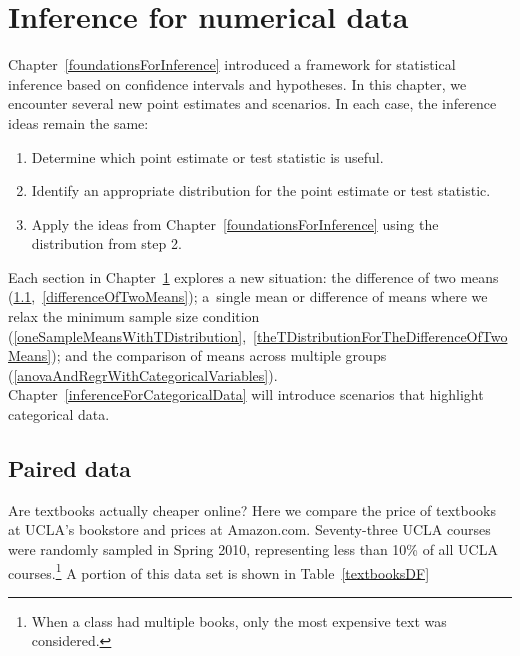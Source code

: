 \chapter{Inference for numerical data}
\label{inferenceForNumericalData}

Chapter~\ref{foundationsForInference} introduced a framework for statistical inference based on confidence intervals and hypotheses. In this chapter, we encounter several new point estimates and scenarios. In each case, the inference ideas remain the same:
\begin{enumerate}
\setlength{\itemsep}{0mm}
\item Determine which point estimate or test statistic is useful.
\item Identify an appropriate distribution for the point estimate or test statistic.
\item Apply the ideas from Chapter~\ref{foundationsForInference} using the distribution from step 2.
\end{enumerate}
Each section in Chapter~\ref{inferenceForNumericalData} explores a new situation: the difference of two means (\ref{pairedData},~\ref{differenceOfTwoMeans}); a~single mean or difference of means where we relax the minimum sample size condition (\ref{oneSampleMeansWithTDistribution},~\ref{theTDistributionForTheDifferenceOfTwoMeans}); and the comparison of means across multiple groups (\ref{anovaAndRegrWithCategoricalVariables}). Chapter~\ref{inferenceForCategoricalData} will introduce scenarios that highlight categorical data.


\section{Paired data}
\label{pairedData}


Are textbooks actually cheaper online? Here we compare the price of textbooks at UCLA's bookstore and prices at Amazon.com. Seventy-three UCLA courses were randomly sampled in Spring 2010, representing less than 10\% of all UCLA courses.\footnote{When a class had multiple books, only the most expensive text was considered.} A portion of this data set is shown in Table~\ref{textbooksDF}

